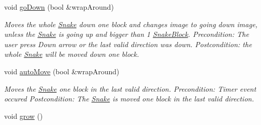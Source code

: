 \begin{DoxyCompactItemize}
void \hyperlink{classSnake_aba257e6da370608bf0f1587b04e3d900}{go\-Down} (bool \&wrap\-Around)
\begin{DoxyCompactList}\small\item\em \-Moves the whole \hyperlink{classSnake}{\-Snake} down one block and changes image to going down image, unless the \hyperlink{classSnake}{\-Snake} is going up and bigger than 1 \hyperlink{classSnakeBlock}{\-Snake\-Block}. \-Precondition\-: \-The user press \-Down arrow or the last valid direction was down. \-Postcondition\-: the whole \hyperlink{classSnake}{\-Snake} will be moved down one block. \end{DoxyCompactList}\item 
void \hyperlink{classSnake_ac5c9c032ac3f9c5969e2a447a9600327}{auto\-Move} (bool \&wrap\-Around)
\begin{DoxyCompactList}\small\item\em \-Moves the \hyperlink{classSnake}{\-Snake} one block in the last valid direction. \-Precondition\-: \-Timer event occured \-Postcondition\-: \-The \hyperlink{classSnake}{\-Snake} is moved one block in the last valid direction. \end{DoxyCompactList}\item 
\hypertarget{classSnake_a959eeb2c461a36a9e51de931d6917a75}{void \hyperlink{classSnake_a959eeb2c461a36a9e51de931d6917a75}{grow} ()}\label{classSnake_a959eeb2c461a36a9e51de931d6917a75}


\end{DoxyCompactItemize}
